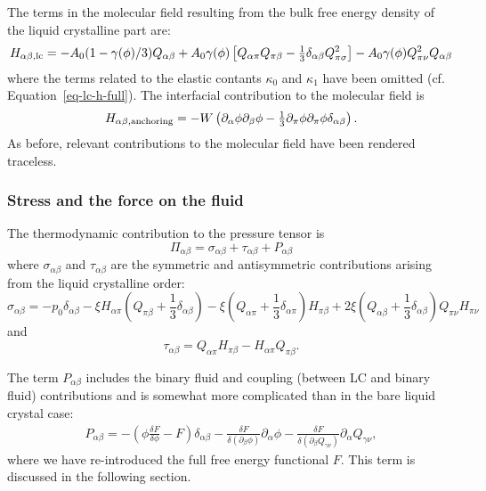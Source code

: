 The terms in the molecular field resulting from the bulk free energy
density of the liquid crystalline part are:
\begin{equation}
H_{\alpha\beta,{\rm lc}} = -A_0 (1 - \gamma(\phi)/3) Q_{\alpha\beta}
+A_0 \gamma(\phi)\left[ Q_{\alpha\pi} Q_{\pi\beta}
     - {\textstyle\frac{1}{3}} \delta_{\alpha\beta} Q_{\pi\sigma}^2\right]
-A_0 \gamma (\phi)Q_{\pi\nu}^2 Q_{\alpha\beta} \\ \nonumber
\end{equation}
where the terms related to the elastic contants $\kappa_0$ and $\kappa_1$
have been omitted (cf. Equation~\ref{eq-lc-h-full}). The interfacial
contribution to the molecular field is
\begin{equation}
H_{\alpha\beta, {\rm anchoring}}  = -W \left( \partial_{\alpha}\phi\partial_{\beta}\phi
- {\textstyle\frac{1}{3}}
  \partial_{\pi}\phi \partial_{\pi}\phi \delta_{\alpha\beta} \right).
\end{equation}
As before, relevant contributions to the molecular field have
been rendered traceless.

\subsubsection{Stress and the force on the fluid}
The thermodynamic contribution to the pressure tensor is
\begin{equation}
\label{eq-lc-emulsion-stress}
\Pi_{\alpha\beta} = \sigma_{\alpha\beta} + \tau_{\alpha\beta} + P_{\alpha\beta}
\end{equation}
where $\sigma_{\alpha\beta}$ and $\tau_{\alpha\beta}$ are the symmetric and
antisymmetric contributions
arising from the liquid crystalline order: 
\begin{equation}
\sigma_{\alpha\beta} =
-p_0\delta_{\alpha\beta}
- \xi H_{\alpha\pi}
  \left(Q_{\pi\beta}+{\textstyle \frac{1}{3}} \delta_{\alpha\beta}\right)
- \xi
  \left(Q_{\alpha\pi} + {\textstyle\frac{1}{3}}\delta_{\alpha\pi}\right)
  H_{\pi\beta}
+ 2\xi \left(Q_{\alpha\beta} + {\textstyle \frac{1}{3}}\delta_{\alpha\beta}
\right) Q_{\pi\nu} H_{\pi\nu}
\nonumber
\end{equation}
and
\begin{equation}
\tau_{\alpha\beta} = Q_{\alpha\pi} H_{\pi\beta} - H_{\alpha\pi}Q_{\pi\beta}.
\nonumber
\end{equation}

The term $P_{\alpha\beta}$ includes the binary fluid and coupling
(between LC and binary fluid) contributions and is somewhat more
complicated than in the bare liquid crystal case:
\begin{eqnarray}
\label{eq-lc-emulsion-pab}
P_{\alpha\beta} =
-\left( \phi\frac{\delta  F}{\delta\phi} - F \right) \delta_{\alpha\beta}
-\frac{\delta F}{\delta \left(\partial_{\beta}\phi\right)}\partial_{\alpha}\phi
-\frac{\delta F}{\delta\left(\partial_{\beta}Q_{\gamma\nu}\right)}\partial_{\alpha}Q_{\gamma\nu},
\end{eqnarray}
where we have re-introduced the full free energy functional $F$.
This term is discussed in the following section.

